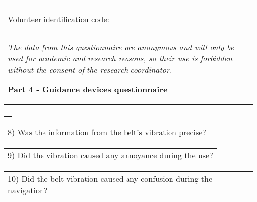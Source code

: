 \FloatBarrier

\begin{table}[!thb]
    \begin{tabular}{m{1\linewidth}}

        {\color{gray}

        Volunteer identification code: \rule{1in}{.2mm}
        
        \textit{The data from this questionnaire are anonymous and will only be used for academic and research reasons, so their use is forbidden without the consent of the research coordinator.}
        }
        
        \begin{center}
        \textbf{Part 4 - Guidance devices questionnaire}
        \end{center}
        
    \end{tabular}
%
    \begin{tabular}{>{\centering\arraybackslash}m{1\linewidth}}
        {\large TEST 2 – HAPTIC BELT}
    \end{tabular}

    \begin{tabular}{m{1\linewidth}}
        \vspace{2ex}
        8)	Was the information from the belt's vibration precise?
    \end{tabular}

        
        

    \begin{tabular}{m{1\linewidth}}
        \vspace{2ex}
        9)	Did the vibration caused any annoyance during the use?
    \end{tabular}

        
        

    \begin{tabular}{m{1\linewidth}}
        \vspace{2ex}
        10)	Did the belt vibration caused any confusion during the navigation?
    \end{tabular}


\end{table}
